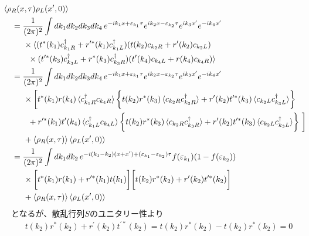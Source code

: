 \documentclass[10pt,a4j]{jarticle}
\begin{document}
\begin{align}
& \hspace{-4mm} \braket{\rho_{R}(x,\tau) \rho_{L}(x^\prime,0)}  \nonumber \\
& = \frac{1}{(2\pi)^2} \int dk_1 dk_2 dk_3 dk_4 \,
e^{-ik_1x+\varepsilon_{k_1}\tau}e^{ik_2x-\varepsilon_{k_2}\tau}e^{ik_3x^\prime}e^{-ik_4x^\prime}\nonumber \\
& \hspace{5mm} \times \langle (t^{*} (k_1)c^\dagger_{k_1R} + r^{\prime*} (k_1)c^\dagger_{k_1L})  (t(k_2) c_{k_2R} + r^\prime(k_2) c_{k_2L}) \nonumber \\
& \hspace{7mm} \times (t^{\prime*} (k_3)c^\dagger_{k_3L} + r^* (k_3)c^\dagger_{k_3R}) 
(t^\prime(k_4)  c_{k_4L} + r(k_4) c_{k_4R}) \rangle \nonumber \\
&=  \frac{1}{(2\pi)^2} \int dk_1 dk_2 dk_3 dk_4 \,
e^{-ik_1x+\varepsilon_{k_1}\tau}e^{ik_2x-\varepsilon_{k_2}\tau}e^{ik_3x^\prime}e^{-ik_4x^\prime} \nonumber \\
& \hspace{5mm} \times \biggl[ t^*(k_1) r(k_4) \braket{c^\dagger_{k_1R}c_{k_4R}}\biggl\{ t(k_2)r^*(k_3) \braket{c_{k_2R}c^\dagger_{k_3R}} + r^\prime(k_2) t^{\prime*}(k_3)\braket{c_{k_2L}c^\dagger_{k_3L}} \biggr\} \nonumber \\
& \hspace{7mm}  + r^{\prime*}(k_1) t^\prime (k_4)\braket{c^\dagger_{k_1L}c_{k_4L}} \biggl\{ t(k_2)r^*(k_3) \braket{c_{k_2R}c^\dagger_{k_3R}} + r^\prime(k_2) t^{\prime*} (k_3)\braket{c_{k_2L}c^\dagger_{k_3L}} \biggr\} \  \biggr]\nonumber \\
& \hspace{5mm} + \braket{\rho_{R}(x,\tau)}  \braket{ \rho_{L}(x^\prime,0)}  \nonumber \\
&= \frac{1}{(2\pi)^2} \int dk_1 dk_2\,
e^{-i(k_1-k_2)(x + x^\prime) + (\varepsilon_{k_1} - \varepsilon_{k_2})\tau}f(\varepsilon_{k_1})(1 - f(\varepsilon_{k_2}))\nonumber \\
&\hspace{5mm} \times \biggl[ t^*(k_1) r(k_1) +  r^{\prime*}(k_1) t(k_1) \biggr] \biggl[  t(k_2)r^*(k_2) +  r^\prime(k_2) t^{\prime*}(k_2) \biggr]
\nonumber \\
& \hspace{5mm} + \braket{\rho_{R}(x,\tau)}  \braket{ \rho_{L}(x^\prime,0)} 
\end{align}
となるが、散乱行列$S$のユニタリー性より
\begin{align}
t(k_2)r^*(k_2) +  r^\prime(k_2) t^{\prime*}(k_2)  = t(k_2)r^*(k_2)  - t(k_2)r^*(k_2)  = 0
\end{align}
\end{document}
